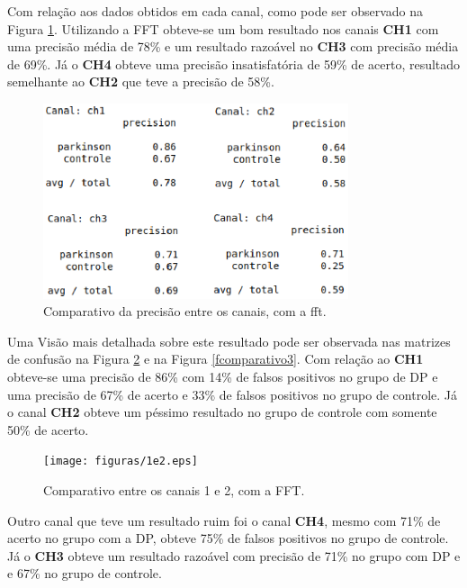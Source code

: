 Com relação aos dados obtidos em cada canal, como pode ser observado na Figura \ref{fcomparativo1}. Utilizando a FFT obteve-se um bom resultado nos canais \textbf{CH1} com uma precisão média de 78\% e um resultado razoável no \textbf{CH3} com precisão média de 69\%. Já o \textbf{CH4} obteve uma precisão insatisfatória de  59\% de acerto, resultado semelhante ao \textbf{CH2} que teve a precisão de 58\%.

\begin{figure}[t]
    \centering
    \includegraphics[width=0.8\textwidth]{figuras/fcomparativo.eps}
    \caption{Comparativo da precisão entre os canais, com a fft.}
    \label{fcomparativo1}
\end{figure}

Uma Visão mais detalhada sobre este resultado pode ser observada nas matrizes de confusão na Figura \ref{fcomparativo2} e na Figura \ref{fcomparativo3}. Com relação ao \textbf{CH1} obteve-se uma precisão de 86\% com 14\% de falsos positivos no grupo de DP e uma precisão de 67\% de acerto e 33\% de falsos positivos no grupo de controle. Já o canal \textbf{CH2} obteve um péssimo resultado no grupo de controle com somente 50\% de acerto. 

\begin{figure}[!t]
    \centering
    \texttt{[image: figuras/1e2.eps]}
    \caption{Comparativo entre os canais 1 e 2, com a FFT.}
    \label{fcomparativo2}
\end{figure}

Outro canal que teve um resultado ruim foi o canal \textbf{CH4}, mesmo com 71\% de acerto no grupo com a DP, obteve 75\% de falsos positivos no grupo de controle. Já o \textbf{CH3} obteve um resultado razoável com precisão de 71\% no grupo com DP e e 67\% no grupo de controle.

